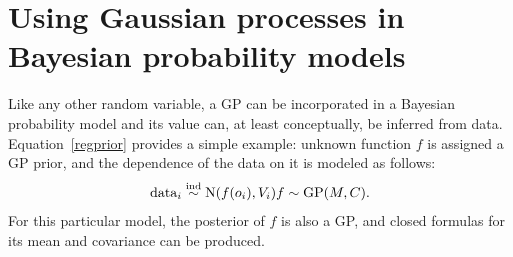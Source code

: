 \documentclass[article]{jss}
\begin{document}
\section{Using Gaussian processes in Bayesian probability models}
\label{sec:gp-sub} 

Like any other random variable, a GP can be incorporated in a Bayesian probability model and its value can, at least conceptually, be inferred from data. Equation~\ref{regprior} provides a simple example: unknown function $f$ is assigned a GP prior, and the dependence of the data on it is modeled as follows:
\begin{eqnarray*}
    \textup{data}_i \stackrel{\tiny{\textup{ind}}}{\sim} \textup{N}(f(o_i), V_i)
    f \sim \textup{GP}(M,C).
\end{eqnarray*}
For this particular model, the posterior of $f$ is also a GP, and closed formulas for its mean and covariance can be produced.
\end{document}
